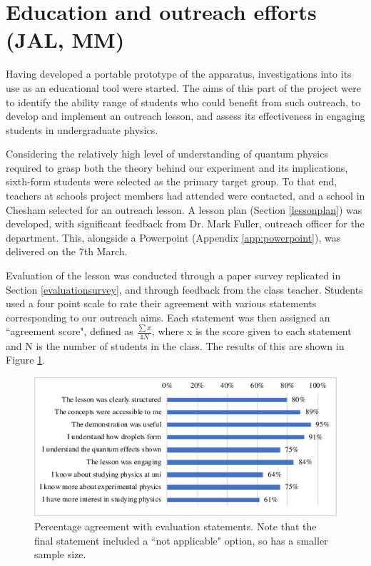 \section{Education and outreach efforts (JAL, MM)}
Having developed a portable prototype of the apparatus, investigations into its use as an educational tool were started. The aims of this part of the project were to identify the ability range of students who could benefit from such outreach, to develop and implement an outreach lesson, and assess its effectiveness in engaging students in undergraduate physics.

Considering the relatively high level of understanding of quantum physics required to grasp both the theory behind our experiment and its implications, sixth-form students were selected as the primary target group. To that end, teachers at schools project members had attended were contacted, and a school in Chesham selected for an outreach lesson. A lesson plan (Section \ref{lessonplan}) was developed, with significant feedback from Dr. Mark Fuller, outreach officer for the department. This, alongside a Powerpoint (Appendix \ref{app:powerpoint}), was delivered on the 7th March.

Evaluation of the lesson was conducted through a paper survey replicated in Section \ref{evaluationsurvey}, and through feedback from the class teacher. Students used a four point scale to rate their agreement with various statements corresponding to our outreach aims. Each statement was then assigned an ``agreement score", defined as $\frac{\sum{x}}{4N}$, where x is the score given to each statement and N is the number of students in the class. The results of this are shown in Figure \ref{fig:evaluationchart}.

\begin{figure}[h]
\centering
\includegraphics[width=\textwidth]{education/evaluationchart.pdf}
\caption{Percentage agreement with evaluation statements. Note that the final statement included a ``not applicable" option, so has a smaller sample size.}
\label{fig:evaluationchart}
\end{figure}

